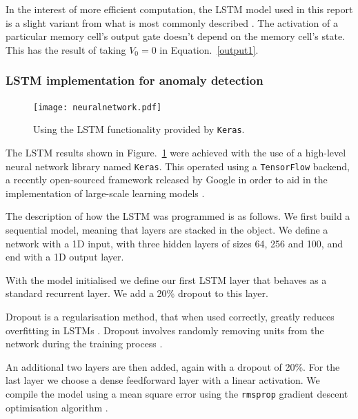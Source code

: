 In the interest of more efficient computation, the LSTM model used in this report is a slight variant from what is most commonly described \cite{Graves2012}. The activation of a particular memory cell's output gate doesn't depend on the memory cell's state. This has the result of taking $V_0 = 0$ in Equation.~\eqref{output1}.

\subsubsection{LSTM implementation for anomaly detection}

\begin{figure}[t]
    \centering
    \texttt{[image: neuralnetwork.pdf]}
    \caption[Neural Network]{Using the LSTM functionality provided by \texttt{Keras}.}
    \label{fig:neuralnet}
\end{figure}

The LSTM results shown in Figure.~\ref{fig:neuralnet} were achieved with the use of a high-level neural network library named \texttt{Keras}. This operated using a \texttt{TensorFlow} backend, a recently open-sourced framework released by Google in order to aid in the implementation of large-scale learning models \cite{Abadi:2016:TSL:3026877.3026899}.

The description of how the LSTM was programmed is as follows. We first build a sequential model, meaning that layers are stacked in the object.  We define a network with a 1D input, with three hidden layers of sizes 64, 256 and 100, and end with a 1D output layer.

With the model initialised we define our first LSTM layer that behaves as a standard recurrent layer. We add a 20\% dropout to this layer. 

Dropout is a regularisation method, that when used correctly, greatly reduces overfitting in LSTMs \cite{2014arXiv1409.2329Z}. Dropout involves randomly removing units from the network during the training process \cite{2013arXiv1311.0701B}.

An additional two layers are then added, again with a dropout of 20\%. For the last layer we choose a dense feedforward layer with a linear activation. We compile the model using a mean square error using the \texttt{rmsprop} gradient descent optimisation algorithm \cite{krause2016multiplicative}.

